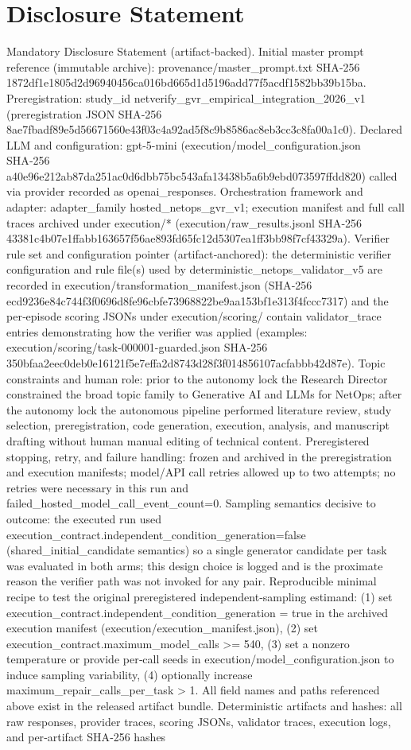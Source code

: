 \documentclass[conference]{IEEEtran}
\begin{document}
\section*{Disclosure Statement}
Mandatory Disclosure Statement (artifact‑backed). Initial master prompt reference (immutable archive): provenance/master\_prompt.txt SHA‑256 1872df1e1805d2d96940456ca016bd665d1d5196add77f5acdf1582bb39b15ba. Preregistration: study\_id netverify\_gvr\_empirical\_integration\_2026\_v1 (preregistration JSON SHA‑256 8ae7fbadf89e5d56671560e43f03c4a92ad5f8c9b8586ac8eb3cc3c8fa00a1c0). Declared LLM and configuration: gpt-5-mini (execution/model\_configuration.json SHA‑256 a40e96e212ab87da251ac0d6dbb75bc543afa13438b5a6b9ebd073597ffdd820) called via provider recorded as openai\_responses. Orchestration framework and adapter: adapter\_family hosted\_netops\_gvr\_v1; execution manifest and full call traces archived under execution/* (execution/raw\_results.jsonl SHA‑256 43381c4b07e1ffabb163657f56ae893fd65fc12d5307ea1ff3bb98f7cf43329a). Verifier rule set and configuration pointer (artifact‑anchored): the deterministic verifier configuration and rule file(s) used by deterministic\_netops\_validator\_v5 are recorded in execution/transformation\_manifest.json (SHA‑256 ecd9236e84c744f3f0696d8fe96cbfe73968822be9aa153bf1e313f4fccc7317) and the per‑episode scoring JSONs under execution/scoring/ contain validator\_trace entries demonstrating how the verifier was applied (examples: execution/scoring/task-000001-guarded.json SHA‑256 350bfaa2eec0deb0e16121f5e7effa2d8743d28f3f014856107acfabbb42d87e). Topic constraints and human role: prior to the autonomy lock the Research Director constrained the broad topic family to Generative AI and LLMs for NetOps; after the autonomy lock the autonomous pipeline performed literature review, study selection, preregistration, code generation, execution, analysis, and manuscript drafting without human manual editing of technical content. Preregistered stopping, retry, and failure handling: frozen and archived in the preregistration and execution manifests; model/API call retries allowed up to two attempts; no retries were necessary in this run and failed\_hosted\_model\_call\_event\_count=0. Sampling semantics decisive to outcome: the executed run used execution\_contract.independent\_condition\_generation=false (shared\_initial\_candidate semantics) so a single generator candidate per task was evaluated in both arms; this design choice is logged and is the proximate reason the verifier path was not invoked for any pair. Reproducible minimal recipe to test the original preregistered independent‑sampling estimand: (1) set execution\_contract.independent\_condition\_generation = true in the archived execution manifest (execution/execution\_manifest.json), (2) set execution\_contract.maximum\_model\_calls >= 540, (3) set a nonzero temperature or provide per‑call seeds in execution/model\_configuration.json to induce sampling variability, (4) optionally increase maximum\_repair\_calls\_per\_task > 1. All field names and paths referenced above exist in the released artifact bundle. Deterministic artifacts and hashes: all raw responses, provider traces, scoring JSONs, validator traces, execution logs, and per‑artifact SHA‑256 hashes 
\end{document}
